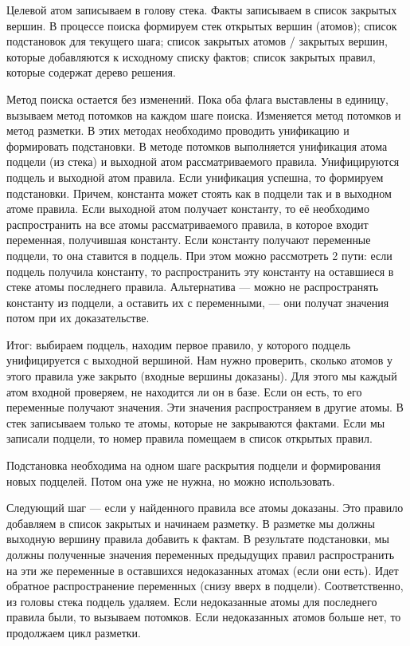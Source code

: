 Целевой атом записываем в голову стека. Факты записываем в список закрытых вершин. В процессе поиска формируем стек открытых вершин (атомов); список подстановок для текущего шага; список закрытых атомов / закрытых вершин, которые добавляются к исходному списку фактов; список закрытых правил, которые содержат дерево решения.

Метод поиска остается без изменений. Пока оба флага выставлены в единицу, вызываем метод потомков на каждом шаге поиска. Изменяется метод потомков и метод разметки. В этих методах необходимо проводить унификацию и формировать подстановки. В методе потомков выполняется унификация атома подцели (из стека) и выходной атом рассматриваемого правила. Унифицируются подцель и выходной атом правила. Если унификация успешна, то формируем подстановки. Причем, константа может стоять как в подцели так и в выходном атоме правила. Если выходной атом получает константу, то её необходимо распространить на все атомы рассматриваемого правила, в которое входит переменная, получившая константу. Если константу получают переменные подцели, то она ставится в подцель. При этом можно рассмотреть 2 пути: если подцель получила константу, то распространить эту константу на оставшиеся в стеке атомы последнего правила. Альтернатива --- можно не распространять константу из подцели, а оставить их с переменными, --- они получат значения потом при их доказательстве.

Итог: выбираем подцель, находим первое правило, у которого подцель унифицируется с выходной вершиной. Нам нужно проверить, сколько атомов у этого правила уже закрыто (входные вершины доказаны). Для этого мы каждый атом входной проверяем, не находится ли он в базе. Если он есть, то его переменные получают значения. Эти значения распространяем в другие атомы. В стек записываем только те атомы, которые не закрываются фактами. Если мы записали подцели, то номер правила помещаем в список открытых правил.

Подстановка необходима на одном шаге раскрытия подцели и формирования новых подцелей. Потом она уже не нужна, но можно использовать.

Следующий шаг --- если у найденного правила все атомы доказаны. Это правило добавляем в список закрытых и начинаем разметку. В разметке мы должны выходную вершину правила добавить к фактам. В результате подстановки, мы должны полученные значения переменных предыдущих правил распространить на эти же переменные в оставшихся недоказанных атомах (если они есть). Идет обратное распространение переменных (снизу вверх в подцели). Соответственно, из головы стека подцель удаляем. Если недоказанные атомы для последнего правила были, то вызываем потомков. Если недоказанных атомов больше нет, то продолжаем цикл разметки.

